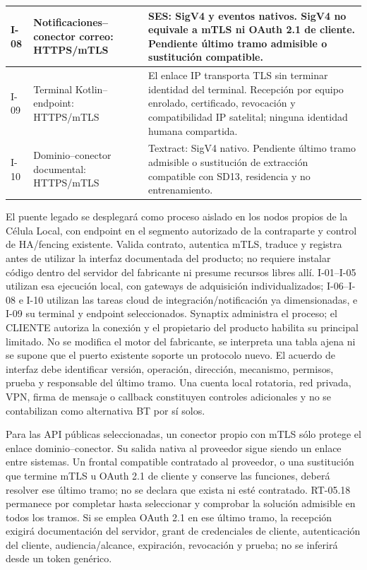 \begin{longtable}{@{}L{.12\linewidth}L{.32\linewidth}L{\dimexpr.56\tabcolsep\relax}@{}}
I-08 & Notificaciones--conector correo: HTTPS/mTLS & SES: SigV4 y eventos nativos. SigV4 no equivale a mTLS ni OAuth 2.1 de cliente. Pendiente último tramo admisible o sustitución compatible.\\ \hline
I-09 & Terminal Kotlin--endpoint: HTTPS/mTLS & El enlace IP transporta TLS sin terminar identidad del terminal. Recepción por equipo enrolado, certificado, revocación y compatibilidad IP satelital; ninguna identidad humana compartida.\\ \hline
I-10 & Dominio--conector documental: HTTPS/mTLS & Textract: SigV4 nativo. Pendiente último tramo admisible o sustitución de extracción compatible con SD13, residencia y no entrenamiento.\\ \hline
\end{longtable}

El puente legado se desplegará como proceso aislado en los nodos propios de la Célula Local, con endpoint en el segmento autorizado de la contraparte y control de HA/fencing existente. Valida contrato, autentica mTLS, traduce y registra antes de utilizar la interfaz documentada del producto; no requiere instalar código dentro del servidor del fabricante ni presume recursos libres allí. I-01--I-05 utilizan esa ejecución local, con gateways de adquisición individualizados; I-06--I-08 e I-10 utilizan las tareas cloud de integración/notificación ya dimensionadas, e I-09 su terminal y endpoint seleccionados. Synaptix administra el proceso; el CLIENTE autoriza la conexión y el propietario del producto habilita su principal limitado. No se modifica el motor del fabricante, se interpreta una tabla ajena ni se supone que el puerto existente soporte un protocolo nuevo. El acuerdo de interfaz debe identificar versión, operación, dirección, mecanismo, permisos, prueba y responsable del último tramo. Una cuenta local rotatoria, red privada, VPN, firma de mensaje o callback constituyen controles adicionales y no se contabilizan como alternativa BT por sí solos.

Para las API públicas seleccionadas, un conector propio con mTLS sólo protege el enlace dominio--conector. Su salida nativa al proveedor sigue siendo un enlace entre sistemas. Un frontal compatible contratado al proveedor, o una sustitución que termine mTLS u OAuth 2.1 de cliente y conserve las funciones, deberá resolver ese último tramo; no se declara que exista ni esté contratado. RT-05.18 permanece por completar hasta seleccionar y comprobar la solución admisible en todos los tramos. Si se emplea OAuth 2.1 en ese último tramo, la recepción exigirá documentación del servidor, grant de credenciales de cliente, autenticación del cliente, audiencia/alcance, expiración, revocación y prueba; no se inferirá desde un token genérico.

